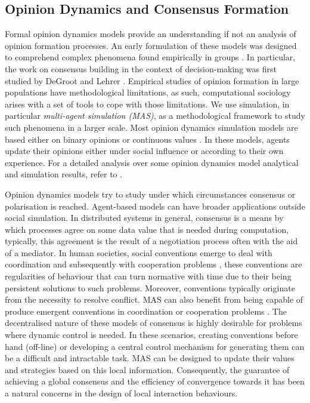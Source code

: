 \documentclass[preprint,number]{elsarticle}
\begin{document}
	\subsection{Opinion Dynamics and Consensus Formation}
	Formal opinion dynamics models provide an understanding if not an analysis of opinion formation processes.  An early formulation of these models was designed to comprehend complex phenomena found empirically in groups \cite{French1956}. In particular, the work on consensus building in the context of decision-making was first studied by DeGroot \cite{Degroot74} and Lehrer \cite{Lehrer1975}. Empirical studies of opinion formation in large populations have methodological limitations, as such, computational sociology arises with a set of tools to cope with those limitations. We use simulation, in particular \textit{multi-agent simulation (MAS)}, as a methodological framework to study such phenomena in a larger scale. Most opinion dynamics simulation models are based either on binary opinions \cite{Galam1997,Antunes2009} or continuous values \cite{Deffuant2000,Deffuant2002}. In these models, agents update their opinions either under social influence or according to their own experience. For a detailed analysis over some opinion dynamics model analytical and simulation results, refer to \cite{Hegselmann2002}.
	
	Opinion dynamics models try to study under which circumstances consensus or polarisation is reached. Agent-based models can have broader applications outside social simulation. In distributed systems in general, consensus is a means by which processes agree on some data value that is needed during computation, typically, this agreement is the result of a negotiation process often with the aid of a mediator. In human societies, social conventions emerge to deal with coordination and subsequently with cooperation problems \cite{Lewis1969}, these conventions are regularities of behaviour that can turn normative with time due to their being persistent solutions to such problems. Moreover, conventions typically originate from the necessity to resolve conflict. MAS can also benefit from being capable of produce emergent conventions in coordination or cooperation problems \cite{Delgado2002}. The decentralised nature of these models of consensus is highly desirable for problems where dynamic control is needed. In these scenarios, creating conventions before hand (off-line) or developing a central control mechanism for generating them can be a difficult and intractable task. MAS can be designed to update their values and strategies based on this local information. Consequently, the guarantee of achieving a global consensus and the efficiency of convergence towards it has been a natural concerns in the design of local interaction behaviours. 
	
\end{document}
